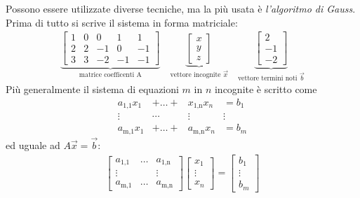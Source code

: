 \documentclass{report}
\begin{document}
  Possono essere utilizzate diverse tecniche, ma la più usata è \emph{l'algoritmo di Gauss}. Prima di tutto si scrive il sistema in forma matriciale:
 \begin{align}
  \underbrace{
  \begin{bmatrix}
    1 & 0 &0 & 1 &1 \\
    2 & 2 &-1 & 0 &-1\\
    3 & 3 & -2 & -1 &-1
  \end{bmatrix}
    }_{\text{matrice coefficenti A}}
    \quad
  \underbrace{
  \begin{bmatrix}
    x \\
    y \\
    z
  \end{bmatrix}}_{\text{vettore incognite } \vec{x}}
    \quad
    \underbrace{
    \begin{bmatrix}
      2 \\
      -1 \\
      -2
    \end{bmatrix}
    }_{ \text{vettore termini noti } \vec{b} }
    \end{align}
    Più generalmente il sistema di equazioni \(m\) in \(n\) incognite è scritto come
    \[
      \begin{matrix}
        a_\text{1,1}x_1 & + \dots + &x_\text{1,n}x_n &= b_1 \\
        \vdots& \cdots & \vdots & \vdots\\
        a_\text{m,1}x_1 & +\dots+&a_\text{m,n}x_n &= b_m
        \end{matrix}
      \]
      ed uguale ad \(A\vec{x}=\vec{b}\):
      \begin{align*}
      \begin{bmatrix}
        a_\text{1,1} & \dots & a_\text{1,n}\\
        \vdots  & & \vdots \\
        a_\text{m,1} & \dots & a_\text{m,n}
      \end{bmatrix}
      \begin{bmatrix}
          x_1\\
          \vdots\\
          x_n
      \end{bmatrix}
        =
        \begin{bmatrix}
          b_1\\
          \vdots\\
          b_m
          \end{bmatrix}
      \end{align*}
\end{document}
